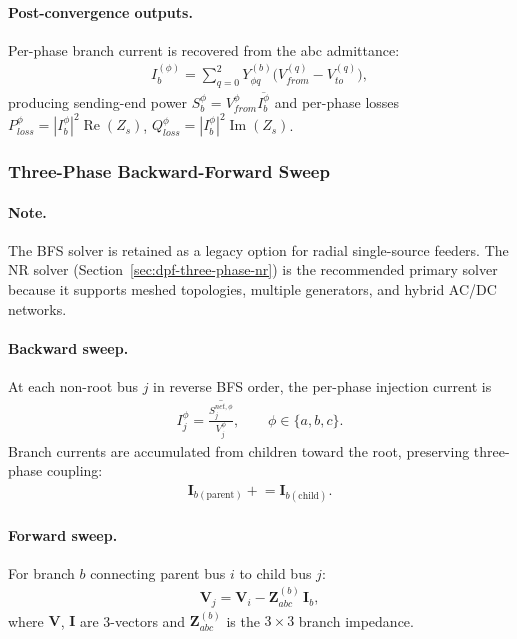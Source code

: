\paragraph{Post-convergence outputs.}
Per-phase branch current is recovered from the abc admittance:
\begin{align}
  I_b^{(\phi)} = \sum_{q=0}^{2} Y^{(b)}_{\phi q}
    \bigl(V_{from}^{(q)} - V_{to}^{(q)}\bigr),
\end{align}
producing sending-end power
$S_b^\phi = V_{from}^\phi \overline{I_b^\phi}$
and per-phase losses
$P_{loss}^\phi = |I_b^\phi|^2 \operatorname{Re}(Z_s)$,
$Q_{loss}^\phi = |I_b^\phi|^2 \operatorname{Im}(Z_s)$.

\subsubsection{Three-Phase Backward-Forward Sweep}
\label{sec:dpf-three-phase-bfs}

\paragraph{Note.} The BFS solver is retained as a legacy option for radial
single-source feeders.  The NR solver
(Section~\ref{sec:dpf-three-phase-nr}) is the recommended primary solver
because it supports meshed topologies, multiple generators, and hybrid AC/DC
networks.

\paragraph{Backward sweep.}
At each non-root bus $j$ in reverse BFS order, the per-phase injection current is
\begin{align}
  I_j^{\phi} = \overline{\frac{S_j^{net,\phi}}{V_j^{\phi}}},
  \qquad \phi \in \{a, b, c\}.
\end{align}
Branch currents are accumulated from children toward the root, preserving
three-phase coupling:
\begin{align}
  \mathbf{I}_{b(\text{parent})} \mathrel{+}= \mathbf{I}_{b(\text{child})}.
\end{align}

\paragraph{Forward sweep.}
For branch $b$ connecting parent bus $i$ to child bus $j$:
\begin{align}
  \mathbf{V}_j = \mathbf{V}_i - \mathbf{Z}_{abc}^{(b)}\, \mathbf{I}_b,
\end{align}
where $\mathbf{V}$, $\mathbf{I}$ are 3-vectors and
$\mathbf{Z}_{abc}^{(b)}$ is the $3\times3$ branch impedance.

